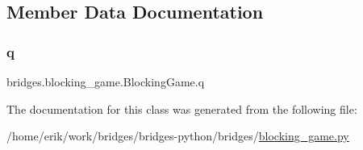 \subsection{Member Data Documentation}
\mbox{\label{classbridges_1_1blocking__game_1_1_blocking_game_a21d2b164100c6cd61a36f8704c69e51f}} 
\subsubsection{\texorpdfstring{q}{q}}
{\footnotesize\ttfamily bridges.\+blocking\+\_\+game.\+Blocking\+Game.\+q}



The documentation for this class was generated from the following file\+:\begin{DoxyCompactItemize}
\item 
/home/erik/work/bridges/bridges-\/python/bridges/\hyperlink{blocking__game_8py}{blocking\+\_\+game.\+py}\end{DoxyCompactItemize}
